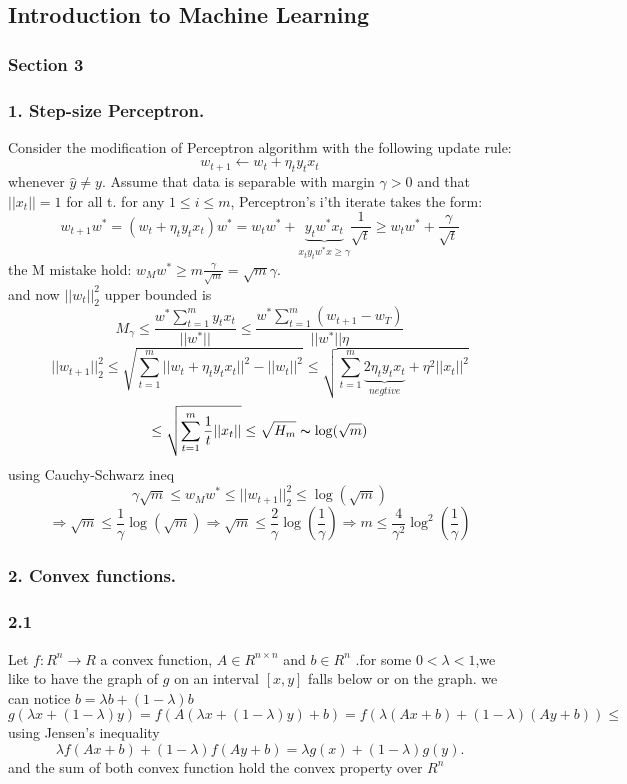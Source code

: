 \documentclass[12pt]{article}
\theoremstyle{plain}
\begin{document}
\begin{center}
\section*{Introduction to Machine Learning}
\subsubsection*{Section 3}
\end{center}
\subsubsection*{ 1. Step-size Perceptron. }
Consider the modification of Perceptron algorithm with the following update rule:
\[w_{t+1} \leftarrow w_t + \eta_ty_tx_t\]
whenever $\hat{y}\neq y$. Assume that data is separable with margin
$\gamma > 0$ and that $||x_t|| = 1 $ for all t.
 for any $1\leq i \leq m$, Perceptron’s i’th iterate takes the
form:
\[ w_{t+1}w^*=(w_t+\eta_ty_tx_t)w^*=w_tw^*+\underbrace{y_tw^*x_t}_{x_ty_tw^*x\geq \gamma}\frac{1}{\sqrt{t}}\geq w_tw^*+\frac{\gamma}{\sqrt{t}}\]
the M mistake hold: $w_{M}w^* \geq m\frac{\gamma}{\sqrt{m}}=\sqrt{m}\gamma$.\\
and now $||w_t||_2^2$ upper bounded is
\[
M_\gamma \leq \frac{w^*\sum^m_{t=1}y_tx_t}{||w^*||}\leq \frac{w^*\sum^m_{t=1}(w_{t+1}-w_T)}{||w^*||\eta}
\]
\[
||w_{t+1}||_2^2\leq \sqrt{\sum^m_{t=1}||w_t+\eta_ty_tx_t ||^2-||w_t||^2
}\leq \sqrt{\sum^m_{t=1}\underbrace{2\eta_ty_tx_t}_{negtive}+\eta^2||x_t||^2
}
\]
\[
\leq \sqrt{\sum^m_{t=1}\frac{1}{t}||x_t||
}
\leq \sqrt{H_m}\thicksim \log(\sqrt{m})
\]
using  Cauchy-Schwarz ineq
\[
\gamma\sqrt{m} \leq w_{M}w^* \leq ||w_{t+1}||_2^2 \leq \log(\sqrt{m})
\]
\[
\Rightarrow \sqrt{m} \leq \frac{1}{\gamma}\log(\sqrt{m})\Rightarrow \sqrt{m} \leq \frac{2}{\gamma}\log(\frac{1}{\gamma})\Rightarrow
m\leq \frac{4}{\gamma^2}\log^2(\frac{1}{\gamma})
\]
\subsubsection*{ 2. Convex functions. }
\subsubsection*{2.1}
Let $f : R^n \rightarrow R$ a convex function, $A \in R^{n\times n}$ and $b\in R^n$
.for some $0< \lambda <1$,we like to have the graph of $g$  on an interval $[x,y]$ falls below or on the graph.  we can notice $b=\lambda b +(1-\lambda)b$
\[g(\lambda x+(1-\lambda)y)=f(A(\lambda x+(1-\lambda)y)+b)=f(\lambda (Ax+b)+(1-\lambda)(Ay+b))\leq
\]
using Jensen's inequality
\[ \lambda f(Ax+b)+(1-\lambda)f(Ay+b)=\lambda g(x)+(1-\lambda)g(y).
\]
and the sum of both convex function hold the convex property over  $R^n$
\end{document}
